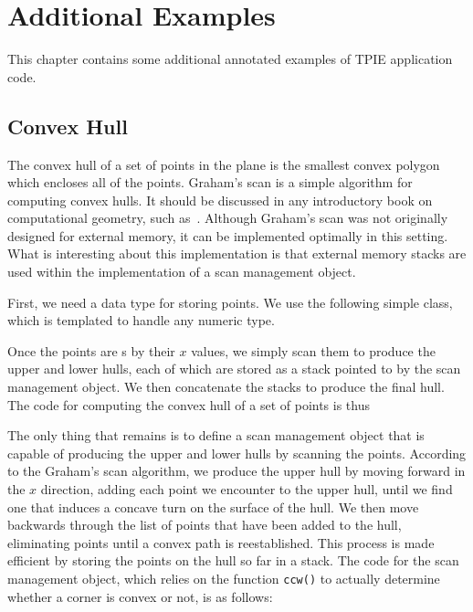 \chapter{Additional Examples} \label{ch:examples}

This chapter contains some additional annotated examples of 
TPIE application code.

\section{Convex Hull}
\label{sec:convex-hull}

The convex hull of a set of points in the plane is the smallest convex
polygon which encloses all of the points.  Graham's scan is a simple
algorithm for computing convex hulls.  It should be discussed in any
introductory book on computational geometry, such
as~\cite{preparata:computational}.  Although Graham's scan was not
originally designed for external memory, it can be implemented optimally in
this setting.  What is interesting about this implementation is that
external memory stacks are used within the implementation of a scan
management object.

First, we need a data type for storing points.  We use the following
simple class, which is templated to handle any numeric type.



Once the points are s by their $x$ values, we simply scan them to
produce the upper and lower hulls, each of which are stored as a stack
pointed to by the scan management object.  We then concatenate the
stacks to produce the final hull.  The code for computing the convex
hull of a set of points is thus



The only thing that remains is to define a scan management object that
is capable of producing the upper and lower hulls by scanning the
points.  According to the Graham's scan algorithm, we produce the
upper hull by moving forward in the $x$ direction, adding each
point we encounter to the upper hull, until we find one that induces a
concave turn on the surface of the hull.  We then move backwards
through the list of points that have been added to the hull,
eliminating points until a convex path is reestablished.  This process
is made efficient by storing the points on the hull so far in a stack.
The code for the scan management object, which relies on the function
\lstinline|ccw()| to actually determine whether a corner is
convex or not, is as follows:

